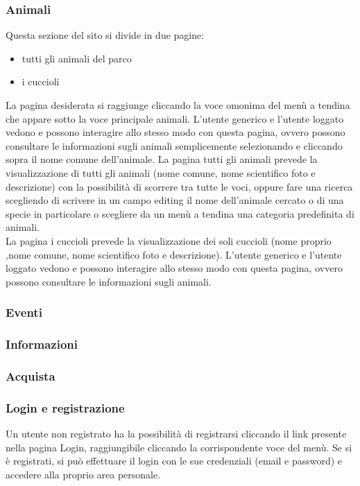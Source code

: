         \subsubsection{Animali}
            Questa sezione del sito si divide in due pagine:
            \begin{itemize}
                \item tutti gli animali del parco
                \item i cuccioli
            \end{itemize}
            La pagina desiderata si raggiunge cliccando la voce omonima del menù a tendina che appare sotto la voce principale animali. L'utente generico e l'utente loggato vedono e possono interagire allo stesso modo con questa pagina, ovvero possono consultare le informazioni sugli animali semplicemente selezionando e cliccando sopra il nome comune dell'animale.
            La pagina tutti gli animali prevede la visualizzazione di tutti gli animali (nome comune, nome scientifico foto e descrizione) con la possibilità di scorrere tra tutte le voci, oppure fare una ricerca scegliendo di scrivere in un campo editing il nome dell'animale cercato o di una specie in particolare o scegliere da un menù a tendina una categoria predefinita di animali. \\
            La pagina i cuccioli prevede la visualizzazione dei soli cuccioli (nome proprio ,nome comune, nome scientifico foto e descrizione). L'utente generico e l'utente loggato vedono e possono interagire allo stesso modo con questa pagina, ovvero possono consultare le informazioni sugli animali.

        \subsubsection{Eventi}
        \subsubsection{Informazioni}
        \subsubsection{Acquista}
        \subsubsection{Login e registrazione}
            Un utente non registrato ha la possibilità di registrarsi cliccando il link presente nella pagina Login, raggiungibile cliccando la corrispondente voce del menù. Se si è registrati, si può effettuare il login con le sue credenziali (email e password) e accedere alla proprio area personale.
